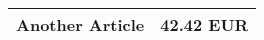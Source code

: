 \documentclass{article}
\begin{document}
\begin{center}
\begin{tabular}{ l r }
\hline

Another Article & 42.42 EUR \\ \hline
\hline
\end{tabular}
\end{center}
\end{document}
